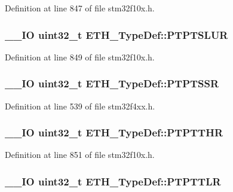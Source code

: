 Definition at line 847 of file stm32f10x.\-h.

\hypertarget{struct_e_t_h___type_def_a0b388c052998631c58d82536ecf3c560}{
\subsubsection[{P\-T\-P\-T\-S\-L\-U\-R}]{\setlength{\rightskip}{0pt plus 5cm}\-\_\-\-\_\-\-I\-O {\bf uint32\-\_\-t} E\-T\-H\-\_\-\-Type\-Def\-::\-P\-T\-P\-T\-S\-L\-U\-R}}\label{struct_e_t_h___type_def_a0b388c052998631c58d82536ecf3c560}


Definition at line 849 of file stm32f10x.\-h.

\hypertarget{struct_e_t_h___type_def_a42a4a6ca26d00623ed87ff25483a6dfb}{
\subsubsection[{P\-T\-P\-T\-S\-S\-R}]{\setlength{\rightskip}{0pt plus 5cm}\-\_\-\-\_\-\-I\-O {\bf uint32\-\_\-t} E\-T\-H\-\_\-\-Type\-Def\-::\-P\-T\-P\-T\-S\-S\-R}}\label{struct_e_t_h___type_def_a42a4a6ca26d00623ed87ff25483a6dfb}


Definition at line 539 of file stm32f4xx.\-h.

\hypertarget{struct_e_t_h___type_def_a10ebf9b64b96114e8bc16bf03d24a4b2}{
\subsubsection[{P\-T\-P\-T\-T\-H\-R}]{\setlength{\rightskip}{0pt plus 5cm}\-\_\-\-\_\-\-I\-O {\bf uint32\-\_\-t} E\-T\-H\-\_\-\-Type\-Def\-::\-P\-T\-P\-T\-T\-H\-R}}\label{struct_e_t_h___type_def_a10ebf9b64b96114e8bc16bf03d24a4b2}


Definition at line 851 of file stm32f10x.\-h.

\hypertarget{struct_e_t_h___type_def_a018a92d638dd4bd98b1640c8dae2a289}{
\subsubsection[{P\-T\-P\-T\-T\-L\-R}]{\setlength{\rightskip}{0pt plus 5cm}\-\_\-\-\_\-\-I\-O {\bf uint32\-\_\-t} E\-T\-H\-\_\-\-Type\-Def\-::\-P\-T\-P\-T\-T\-L\-R}}\label{struct_e_t_h___type_def_a018a92d638dd4bd98b1640c8dae2a289}


